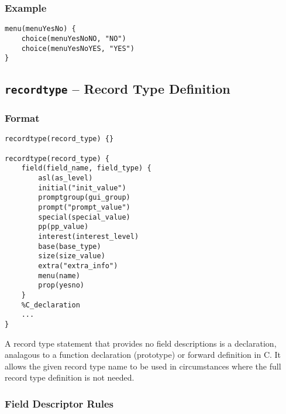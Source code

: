 \subsubsection{Example}

\begin{lstlisting}[language=dbd]
menu(menuYesNo) {
    choice(menuYesNoNO, "NO")
    choice(menuYesNoYES, "YES")
}
\end{lstlisting}

\subsection{\texttt{recordtype} -- Record Type Definition}

\subsubsection{Format}

\begin{lstlisting}[language=dbd]
recordtype(record_type) {}

recordtype(record_type) {
    field(field_name, field_type) {
        asl(as_level)
        initial("init_value")
        promptgroup(gui_group)
        prompt("prompt_value")
        special(special_value)
        pp(pp_value)
        interest(interest_level)
        base(base_type)
        size(size_value)
        extra("extra_info")
        menu(name)
        prop(yesno)
    }
    %C_declaration
    ...
}
\end{lstlisting}

A record type statement that provides no field descriptions is a declaration, analagous to a function declaration (prototype) or forward definition in C.
It allows the given record type name to be used in circumstances where the full record type definition is not needed.

\subsubsection{Field Descriptor Rules}

